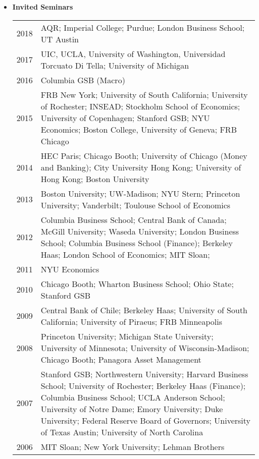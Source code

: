 \documentclass[12pt,letterpaper,serif,overlapped]{res}
\begin{document}
\begin{resume}
\begin{itemize}
\item \textbf{Invited Seminars}
\begin{longtable}{lp{15cm}}
2018 & AQR;  Imperial College; Purdue; London Business School; UT Austin\\[0.1cm]
2017 & UIC, UCLA, University of Washington, Universidad Torcuato Di Tella; University of Michigan \\[0.1cm]
2016 & Columbia GSB (Macro)\\[0.1cm]
2015 & FRB New York; University of South California; University of Rochester; INSEAD; Stockholm School of Economics; University of Copenhagen; Stanford GSB; NYU Economics; Boston College, University of Geneva; FRB Chicago\\[0.1cm]
2014 &HEC Paris; Chicago Booth; University of Chicago (Money and Banking); City University Hong Kong; University of Hong Kong; Boston University\\[0.1cm]
2013 & Boston University; UW-Madison; NYU Stern; Princeton University; Vanderbilt; Toulouse School of Economics \\[0.1cm]
2012 & Columbia Business School; Central Bank of Canada; McGill University; Waseda University; London Business School; Columbia Business School (Finance); Berkeley Haas;  London School of Economics; MIT Sloan;\\[0.1cm]
2011 & NYU Economics\\[0.1cm]
2010 & Chicago Booth; Wharton Business School; Ohio State; Stanford GSB\\[0.1cm]
2009 & Central Bank of Chile; Berkeley Haas; University of South California;   University of Piraeus; FRB Minneapolis\\[0.1cm]
2008 & Princeton University; Michigan State University; University of Minnesota;    University of Wisconsin-Madison; Chicago Booth; Panagora Asset Management\\[0.1cm]
2007 & Stanford GSB; Northwestern University; Harvard Business School;   University of Rochester; Berkeley Haas (Finance); Columbia Business School;  UCLA Anderson School; University of Notre Dame;    Emory University; Duke University; Federal Reserve Board of Governors;  University of Texas Austin; University of North Carolina\\[0.1cm]
2006 & MIT Sloan; New York University; Lehman Brothers\\
\end{longtable}



\end{itemize}
\end{resume}
\end{document}
